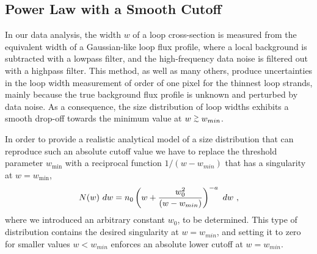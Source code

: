 \documentclass[10pt,preprint]{aastex}  %
\def\gapprox{\lower.4ex\hbox{$\;\buildrel >\over{\scriptstyle\sim}\;$}}
\begin{document}
\subsection{	Power Law with a Smooth Cutoff 		}

In our data analysis,
the width $w$ of a loop cross-section is measured from the equivalent
width of a Gaussian-like loop flux profile, where a local background is
subtracted with a lowpass filter, and the high-frequency data noise is 
filtered out with a highpass filter. This method, as well as many others, 
produce uncertainties in the loop width measurement of order of 
one pixel for the thinnest loop strands, mainly because the true 
background flux profile is unknown and perturbed by data noise. 
As a consequence, the size distribution of loop widths exhibits a 
smooth drop-off towards the minimum value at $w \gapprox w_{min}$. 

In order to provide a realistic
analytical model of a size distribution that can reproduce such an
absolute cutoff value we have to replace the threshold parameter
$w_{\mathrm{min}}$ with a reciprocal function $1/(w-w_{min})$ that has a
singularity at $w=w_{\mathrm{min}}$,
\begin{equation}
	N(w) \ dw = n_0 \left( {w + {w_0^2 \over (w - w_{min}) }} \right)^{-a} 
		\ dw \ ,
\end{equation}
where we introduced an arbitrary constant $w_0$, to be determined.
This type of distribution contains the desired singularity at $w=w_{min}$,
and setting it to zero for smaller values $w < w_{min}$ enforces an
absolute lower cutoff at $w=w_{min}$.
\end{document}
